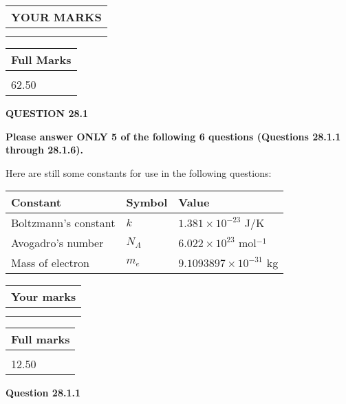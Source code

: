 \documentclass[12pt]{article}
\begin{document}
 
   
   
  
\vspace{0.2in}
  
\noindent\begin{tabular}{|l|}
\hline
 YOUR MARKS  \\
\hline
 \\ 
 \\ 
\hline
\end{tabular}
\hspace{0.05in} \begin{tabular}{|l|}
\hline
 Full Marks  \\
\hline
 \\ 
62.50 \\
\hline
\end{tabular}
{\textbf{\Large{QUESTION
28.1 
}}}
  
  
 
{\textbf{\Large{Please answer ONLY
5 of the following
6 questions (Questions
28.1.1 through
28.1.6). }}}
 
Here are still some constants for use in the following questions:
 
 
\noindent\begin{tabular}{|l|l|l|}
\hline
Constant & Symbol & Value \\
\hline
 
Boltzmann's constant &
$k$ &
 $ 1.381 \times 10^{-23} $
J/K \\
\hline
 
Avogadro's number &
$N_A$ &
 $ 6.022 \times 10^{23} $
mol$^{-1}$ \\
\hline
 
Mass of electron &
$m_e$ &
 $ 9.1093897 \times 10^{-31} $
kg \\
\hline
 
\end{tabular}
 
  
\vspace{0.2in}
  
         \begin{tabular}{|l|}
\hline
 Your marks  \\
\hline
 \\ 
 \\ 
\hline
\end{tabular}
\hspace{0.05in} \begin{tabular}{|l|}
\hline
 Full marks  \\
\hline
 \\ 
12.50 \\
\hline
\end{tabular}
{\textbf{\Large{Question
28.1.1 
}}}
  
\end{document}
